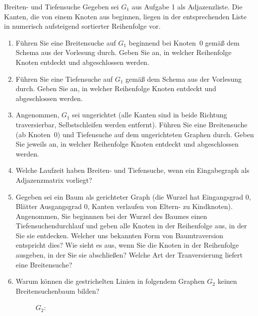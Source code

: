 \documentclass[11pt,a4paper]{article}
\begin{document}
\begin{aufgabe}{2}{Breiten- und Tiefensuche}
    Gegeben sei $G_1$ aus Aufgabe 1 als Adjazenzliste.
    Die Kanten, die von einem Knoten aus beginnen, liegen in der entsprechenden Liste in numerisch aufsteigend sortierter Reihenfolge vor.
    \begin{enumerate}
        \item Führen Sie eine Breitensuche auf $G_1$ beginnend bei Knoten~0 gemäß dem Schema aus der Vorlesung durch.
        Geben Sie an, in welcher Reihenfolge Knoten ent\-deckt und abgeschlossen werden.
        \item Führen Sie eine Tiefensuche auf $G_1$ gemäß dem Schema aus der Vorlesung durch.
        Geben Sie an, in welcher Reihenfolge Knoten entdeckt und abgeschlossen werden.
        \item Angenommen, $G_1$ sei ungerichtet (alle Kanten sind in beide Richtung traversierbar, Selbstschleifen werden entfernt).
        Führen Sie eine Breitensuche (ab Knoten~0) und Tiefensuche auf dem ungerichteten Graphen durch.
        Geben Sie jeweils an, in welcher Reihenfolge Knoten entdeckt und abgeschlossen werden.
        \item Welche Laufzeit haben Breiten- und Tiefensuche, wenn ein Eingabegraph als Adjazenzmatrix vorliegt?
        \item
        Gegeben sei ein Baum als gerichteter Graph (die Wurzel hat Eingangsgrad 0, Blätter Ausgangsgrad 0, Kanten verlaufen von Eltern- zu Kindknoten).
        Angenommen, Sie beginnnen bei der Wurzel des Baumes einen Tiefensuchendurchlauf und geben alle Knoten in der Reihenfolge aus, in der Sie sie entdecken.
        Welcher uns bekannten Form von Baumtraversion entspricht dies?
        Wie sieht es aus, wenn Sie die Knoten in der Reihenfolge ausgeben, in der Sie sie abschließen?
        Welche Art der Tranversierung liefert eine Breitensuche?
        \item
        Warum können die gestrichelten Linien in folgendem Graphen $G_2$ keinen Breitensuchenbaum bilden?
        \begin{figure}[h!]
            \centering
        $G_2$:
        \begin{subfigure}[c]{0.2\textwidth}
            \centering
\end{subfigure}
\end{figure}
\end{enumerate}
\end{aufgabe}
\end{document}
